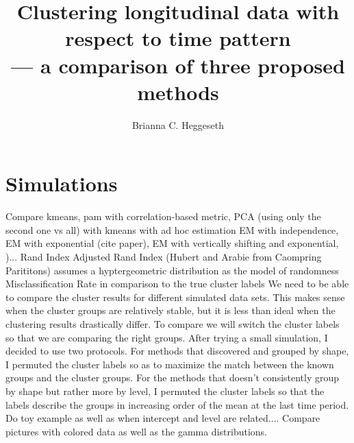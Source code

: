 \documentclass[11pt]{article}
\title{Clustering longitudinal data with respect to time pattern\\--- a comparison of three proposed methods}
\author{Brianna C. Heggeseth}
\begin{document}
\doublespace
\maketitle
\section{Simulations}
Compare kmeans, pam with correlation-based metric, PCA (using only the second one vs all) with kmeans with ad hoc estimation
EM with independence, EM with exponential (cite paper), EM with vertically shifting and exponential, )...
Rand Index
Adjusted Rand Index (Hubert and Arabie from Caompring Parititons) assumes a hyptergeometric distribution as the model of randomness
Misclassification Rate in comparison to the true cluster labels
We need to be able to compare the cluster results for different simulated data sets. This makes sense when the cluster groups are relatively stable, but it is less than ideal when the clustering results drastically differ. To compare we will switch the cluster labels so that we are comparing the right groups. After trying a small simulation, I decided to use two protocols. For methods that discovered and grouped by shape, I permuted the cluster labels so as to maximize the match between the known groups and the cluster groups. For the methods that doesn't consistently group by shape but rather more by level, I permuted the cluster labels so that the labels describe the groups in increasing order of the mean at the last time period. 
Do toy example as well as when intercept and level are related....
Compare pictures with colored data as well as the gamma distributions.
\end{document}
